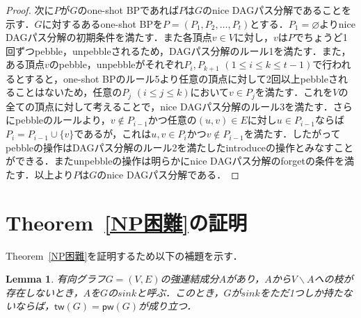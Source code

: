 \documentclass[master]{kuisthesis}		%
\theoremstyle{plain}
\newtheorem{lemma}{Lemma}
\theoremstyle{definition}
\begin{document}
{\begin{proof}
    次に$P$が$G$のone-shot BPであれば$P$は$G$のnice DAGパス分解であることを示す．$G$に対するあるone-shot BPを$P=(P_1, P_2, \dots, P_t)$とする．$P_1 = \varnothing$よりnice DAGパス分解の初期条件を満たす．また各頂点$v \in V$に対し，$v$は$P$でちょうど1回ずつpebble，unpebbleされるため，DAGパス分解のルール1を満たす．また，ある頂点$v$のpebble，unpebbleがそれぞれ$P_i, P_{k+1}$ $(1 \leq i \leq k \leq t-1)$で行われるとすると，one-shot BPのルール5より任意の頂点に対して2回以上pebbleされることはないため，任意の$P_j$ $(i \leq j \leq k)$において$v \in P_j$を満たす．これを$V$の全ての頂点に対して考えることで，nice DAGパス分解のルール3を満たす．さらにpebbleのルールより，$v \notin P_{i-1}$かつ任意の$(u, v) \in E$に対し$u \in P_{i-1}$ならば$P_i = P_{i-1} \cup \{v\}$であるが，これは$u, v \in P_i$かつ$v \notin P_{i-1}$を満たす．したがってpebbleの操作はDAGパス分解のルール2を満たしたintroduceの操作とみなすことができる．またunpebbleの操作は明らかにnice DAGパス分解のforgetの条件を満たす．以上より$P$は$G$のnice DAGパス分解である．
\end{proof}














\section{Theorem~\ref{NP困難}の証明}
Theorem~\ref{NP困難}を証明するため以下の補題を示す．

\begin{lemma}\label{sink}
    有向グラフ$G=(V, E)$の強連結成分$A$があり，$A$から$V \backslash A$への枝が存在しないとき，$A$を$G$の$sink$と呼ぶ．このとき，$G$が$sink$をただ1つしか持たないならば，$\mathsf{tw}(G) = \mathsf{pw}(G)$が成り立つ．
\end{lemma}


}
\end{document}

